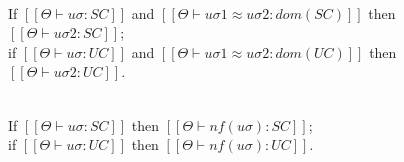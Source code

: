 \begin{corollary}
    \label{corollary:sat-equiv}
    \hfill\\
    If $[[Θ ⊢ uσ : SC]]$ and $[[Θ ⊢ uσ1 ≈ uσ2 : dom(SC)]]$ then $[[Θ ⊢ uσ2 : SC]]$;\\
    if $[[Θ ⊢ uσ : UC]]$ and $[[Θ ⊢ uσ1 ≈ uσ2 : dom(UC)]]$ then $[[Θ ⊢ uσ2 : UC]]$.
\end{corollary}

\begin{corollary}
    \label{corollary:nf-sat}
    \hfill\\
    If $[[Θ ⊢ uσ : SC]]$ then $[[Θ ⊢ nf(uσ) : SC]]$;\\
    if $[[Θ ⊢ uσ : UC]]$ then $[[Θ ⊢ nf(uσ) : UC]]$.
\end{corollary}




